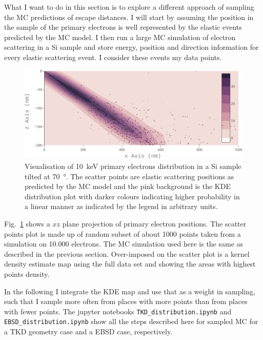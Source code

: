 What I want to do in this section is to explore a different approach of sampling the MC predictions of escape distances. I will start by assuming the position in the sample of the primary electrons is  well represented by the elastic events predicted by the MC model. I then run a large MC simulation of electron scattering in a Si sample and store energy, position and direction information for every elastic scattering event. I consider these events my data points.

\begin{figure}[ht]
\centering
\includegraphics[width=1\linewidth]{Figures/elasticscatter.png}
\caption[Elastic scatter events distribution.]{Visualisation of \SI{10}{\kilo \electronvolt} primary electrons distribution in a Si sample tilted at \SI{70}{\degree}. The scatter points are elastic scattering positions as predicted by the MC model and the pink background is the KDE distribution plot with darker colours indicating higher probability in a linear manner as indicated by the legend in arbitrary units. }
\label{fig:elasticscatter}
\end{figure}

Fig.~\ref{fig:elasticscatter} shows a $xz$ plane projection of primary electron positions. The scatter points plot is made up of random subset of about 1000 points taken from a simulation on 10.000 electrons. The MC simulation used here is the same as described in the previous section. Over-imposed on the scatter plot is a kernel density estimate map using the full data set and showing the areas with highest points density. 




In the following I integrate the KDE map and  use that as a weight in sampling, such that I sample more often from places with more points than from places with fewer points.  The jupyter notebooks \texttt{TKD\_distribution.ipynb} and \texttt{EBSD\_distribution.ipynb} show all the steps described here for sampled MC for a TKD geometry case and a EBSD case, respectively.

